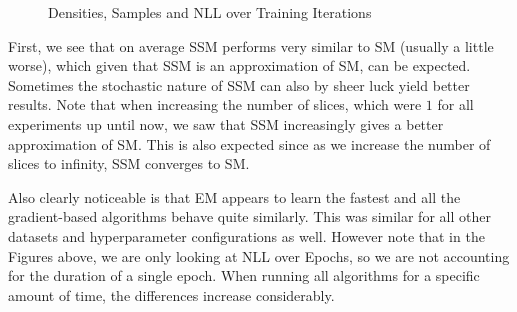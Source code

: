 \begin{figure}[H]
    \centering
    \caption{Densities, Samples and NLL over Training Iterations}
    \label{fig:halfmoons_10_logp}
\end{figure}

First, we see that on average SSM performs very similar to SM (usually a little worse), which 
given that SSM is an approximation of SM, can be expected. Sometimes the stochastic nature of SSM can also 
by sheer luck yield better results. Note that when increasing the number of slices, which were $1$ for all 
experiments up until now, we saw that SSM increasingly gives a better approximation of SM. 
This is also expected since as we increase the number of slices to infinity, SSM converges to SM.

Also clearly noticeable is that EM appears to learn the fastest and all the gradient-based algorithms
behave quite similarly. This was similar for all other datasets and hyperparameter configurations as well. 
However note that in the Figures above, we are only looking at NLL over Epochs, so we are not accounting for the 
duration of a single epoch. When running all algorithms for a specific amount of time, the differences increase considerably. 

